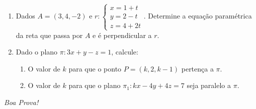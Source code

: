 \documentclass[a4paper,5pt]{amsbook}
\begin{document}
\begin{enumerate}
	\vspace{0.5cm}
	\item Dados $A = (3, 4, -2)$ e 
	$r:\left\{\begin{array}{l}
		x = 1 + t \\
		y = 2 - t \\
		z = 4 + 2t
	\end{array}\right.$. Determine a equa\c{c}\~ao param\'etrica da reta que passa por
$A$ e \'e perpendicular a $r$.

	\vspace{0.5cm}
	\item Dado o plano $\pi: 3x + y - z = 1$, calcule:
	\begin{enumerate}
		\item O valor de $k$ para que o ponto $P = (k, 2, k-1)$ perten\c{c}a a
			$\pi$.
		\item O valor de $k$ para que o plano $\pi_1:kx-4y+4z = 7$ seja
			paralelo a $\pi$.
	\end{enumerate}
\end{enumerate}

\begin{flushright}
	\vspace{1cm}
	\textit{Boa Prova!}
\end{flushright}
\end{document}
